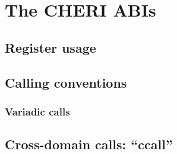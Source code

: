 \chapter{The CHERI ABIs}

\section{Register usage}
\section{Calling conventions}
\subsection{Variadic calls}
\section{Cross-domain calls: ``ccall''}
